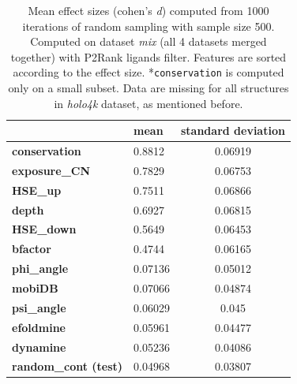 \begin{table}[]
\centering
\begin{tabular}{@{}llc@{}}
\toprule
                      & \textbf{mean} & \textbf{standard deviation} \\ \midrule
\textbf{conservation} & 0.8812        & 0.06919           \\
\textbf{exposure\_CN} & 0.7829        & 0.06753           \\
\textbf{HSE\_up}      & 0.7511        & 0.06866           \\
\textbf{depth}        & 0.6927        & 0.06815           \\
\textbf{HSE\_down}    & 0.5649        & 0.06453           \\
\textbf{bfactor}      & 0.4744        & 0.06165           \\
\textbf{phi\_angle}   & 0.07136       & 0.05012           \\
\textbf{mobiDB}       & 0.07066       & 0.04874           \\
\textbf{psi\_angle}   & 0.06029       & 0.045             \\
\textbf{efoldmine}    & 0.05961       & 0.04477           \\
\textbf{dynamine}     & 0.05236       & 0.04086           \\
\textbf{random\_cont (test)} & 0.04968       & 0.03807           \\ \bottomrule
\end{tabular}
\caption[Mean effect sizes (cohen's \textit{d})]{Mean effect sizes (cohen's \textit{d}) computed from 1000 iterations of random sampling with sample size 500. Computed on dataset \textit{mix} (all 4 datasets merged together) with P2Rank ligands filter. Features are sorted according to the effect size.
\hspace{\textwidth}
*\texttt{conservation} is computed only on a small subset. Data are missing for all structures in \textit{holo4k} dataset, as mentioned before.}
\label{tab:cohensd500}
\end{table}

